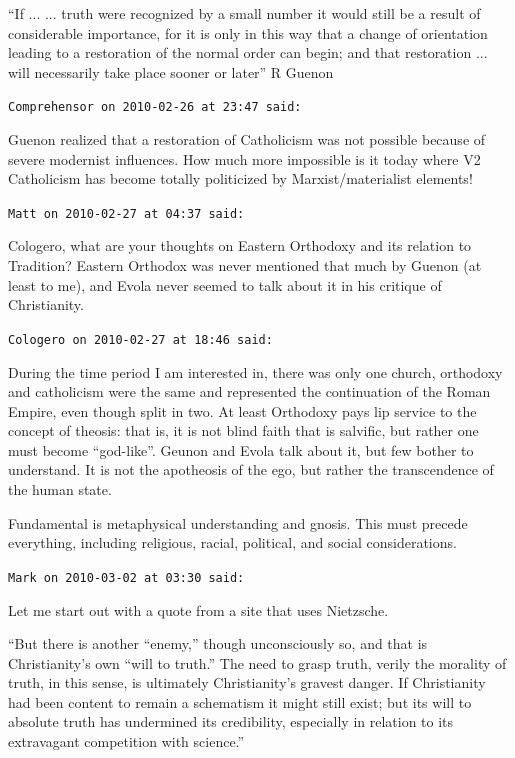 \begin{footnotesize}
\begin{sffamily}
``If ... ... truth were recognized by a small number it would still be a result of considerable importance, for it is only in this way that a change of orientation leading to a restoration of the normal order can begin; and that restoration ... will necessarily take place sooner or later'' R Guenon

\hfill

\texttt{Comprehensor on 2010-02-26 at 23:47 said:}

Guenon realized that a restoration of Catholicism was not possible because of severe modernist influences. How much more impossible is it today where V2 Catholicism has become totally politicized by Marxist/materialist elements!

\hfill

\texttt{Matt on 2010-02-27 at 04:37 said:}

Cologero, what are your thoughts on Eastern Orthodoxy and its relation to Tradition? Eastern Orthodox was never mentioned that much by Guenon (at least to me), and Evola never seemed to talk about it in his critique of Christianity.

\hfill

\texttt{Cologero on 2010-02-27 at 18:46 said:}

During the time period I am interested in, there was only one church, orthodoxy and catholicism were the same and represented the continuation of the Roman Empire, even though split in two. At least Orthodoxy pays lip service to the concept of theosis: that is, it is not blind faith that is salvific, but rather one must become ``god-like''. Geunon and Evola talk about it, but few bother to understand. It is not the apotheosis of the ego, but rather the transcendence of the human state.

Fundamental is metaphysical understanding and gnosis. This must precede everything, including religious, racial, political, and social considerations.

\hfill

\texttt{Mark on 2010-03-02 at 03:30 said:}

Let me start out with a quote from a site that uses Nietzsche.

``But there is another ``enemy,'' though unconsciously so, and that is Christianity's own ``will to truth.'' The need to grasp truth, verily the morality of truth, in this sense, is ultimately Christianity's gravest danger. If Christianity had been content to remain a schematism it might still exist; but its will to absolute truth has undermined its credibility, especially in relation to its extravagant competition with science.''


\end{sffamily}
\end{footnotesize}
